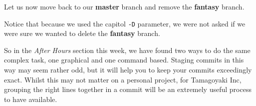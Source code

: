 Let us now move back to our \textbf{master} branch and remove the \textbf{fantasy} branch.


Notice that because we used the capitol \texttt{-D} parameter, we were not asked if we were sure we wanted to delete the \textbf{fantasy} branch.

So in the \emph{After Hours} section this week, we have found two ways to do the same complex task, one graphical and one command based.
Staging commits in this way may seem rather odd, but it will help you to keep your commits exceedingly exact.
Whilst this may not matter on a personal project, for Tamagoyaki Inc, grouping the right lines together in a commit will be an extremely useful process to have available.

